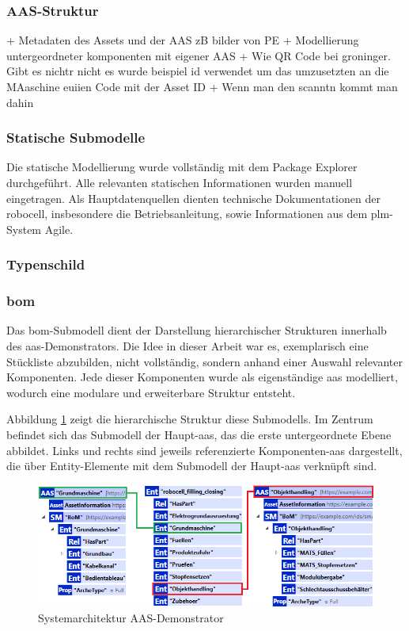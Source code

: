 \subsubsection{AAS-Struktur}

+ Metadaten des Assets und der AAS zB bilder von PE
+ Modellierung untergeordneter komponenten mit eigener AAS
+ Wie QR Code bei groninger. Gibt es nichtr nicht es wurde beispiel id verwendet um das umzusetzten an die MAaschine euiien Code mit der Asset ID
+ Wenn man den scanntn kommt man dahin

\subsubsection{Statische Submodelle}

Die statische Modellierung wurde vollständig mit dem Package Explorer durchgeführt. 
Alle relevanten statischen Informationen wurden manuell eingetragen. 
Als Hauptdatenquellen dienten technische Dokumentationen der robocell, insbesondere die Betriebsanleitung, sowie Informationen aus dem \acs{plm}-System Agile.

\subsubsection*{Typenschild}
\vspace{-0.5em}

\subsubsection*{\acs{bom}}
\vspace{-0.5em}
Das \acs{bom}-Submodell dient der Darstellung hierarchischer Strukturen innerhalb des \acs{aas}-Demonstrators.
Die Idee in dieser Arbeit war es, exemplarisch eine Stückliste abzubilden, nicht vollständig, sondern anhand einer Auswahl relevanter Komponenten.
Jede dieser Komponenten wurde als eigenständige \acs{aas} modelliert, wodurch eine modulare und erweiterbare Struktur entsteht.

Abbildung \ref{fig:BOM} zeigt die hierarchische Struktur diese Submodells.
Im Zentrum befindet sich das Submodell der Haupt-\acs{aas}, das die erste untergeordnete Ebene abbildet.
Links und rechts sind jeweils referenzierte Komponenten-\acs{aas} dargestellt, die über Entity-Elemente mit dem Submodell der Haupt-\acs{aas} verknüpft sind.

\begin{figure}[htbp]
    \centering
        \includegraphics[width=1\textwidth]{Bilder/Ergebnisse/StatischeDaten/BOM.png}
    \caption{Systemarchitektur AAS-Demonstrator}
    \label{fig:BOM}
\end{figure}

